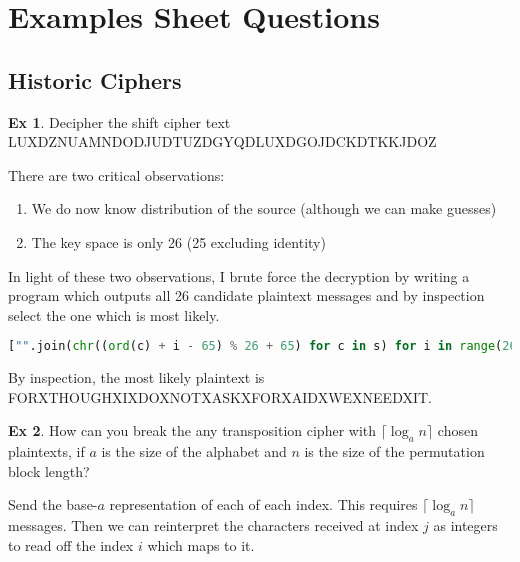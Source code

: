 \documentclass[10pt,\jkfside,a4paper]{article}
\theoremstyle{definition}
\newtheorem{ex}{Ex}
\begin{document}
\section{Examples Sheet Questions}

\subsection{Historic Ciphers}

\begin{ex}

    Decipher the shift cipher text \\
    LUXDZNUAMNDODJUDTUZDGYQDLUXDGOJDCKDTKKJDOZ

\end{ex}

There are two critical observations:
\begin{enumerate}

    \item We do now know distribution of the source (although we can make guesses)

    \item The key space is only 26 (25 excluding identity)

\end{enumerate}

In light of these two observations, I brute force the decryption by writing a program which outputs all 26 candidate plaintext messages and by inspection select the one which is most likely.
\begin{lstlisting}[language=Python]
["".join(chr((ord(c) + i - 65) % 26 + 65) for c in s) for i in range(26)]
\end{lstlisting}

By inspection, the most likely plaintext is FORXTHOUGHXIXDOXNOTXASKXFORXAIDXWEXNEEDXIT.

\begin{ex}

    How can you break the any transposition cipher with $\lceil \log_a n\rceil$ chosen plaintexts, if $a$ is the size of the alphabet and $n$ is the size of the permutation block length?

\end{ex}

Send the base-$a$ representation of each of each index. This requires $\lceil \log_a n\rceil$ messages. Then we can reinterpret the characters received at index $j$ as integers to read off the index $i$ which maps to it.
\end{document}

